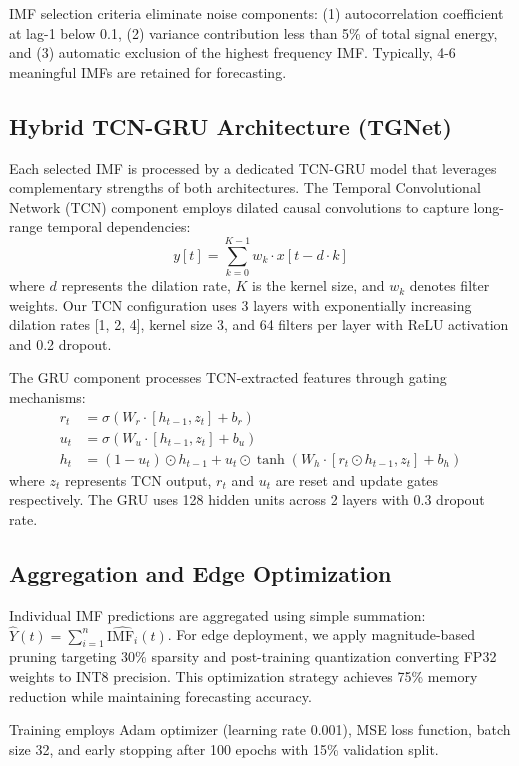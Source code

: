 \documentclass[conference]{IEEEtran}
\begin{document}
IMF selection criteria eliminate noise components: (1) autocorrelation coefficient at lag-1 below 0.1, (2) variance contribution less than 5\% of total signal energy, and (3) automatic exclusion of the highest frequency IMF. Typically, 4-6 meaningful IMFs are retained for forecasting.

\subsection{Hybrid TCN-GRU Architecture (TGNet)}
Each selected IMF is processed by a dedicated TCN-GRU model that leverages complementary strengths of both architectures. The Temporal Convolutional Network (TCN) component employs dilated causal convolutions to capture long-range temporal dependencies:
\begin{equation}
y[t] = \sum_{k=0}^{K-1} w_k \cdot x[t - d \cdot k]
\end{equation}
where $d$ represents the dilation rate, $K$ is the kernel size, and $w_k$ denotes filter weights. Our TCN configuration uses 3 layers with exponentially increasing dilation rates [1, 2, 4], kernel size 3, and 64 filters per layer with ReLU activation and 0.2 dropout.

The GRU component processes TCN-extracted features through gating mechanisms:
\begin{align}
r_t &= \sigma(W_r \cdot [h_{t-1}, z_t] + b_r) \\
u_t &= \sigma(W_u \cdot [h_{t-1}, z_t] + b_u) \\
h_t &= (1 - u_t) \odot h_{t-1} + u_t \odot \tanh(W_h \cdot [r_t \odot h_{t-1}, z_t] + b_h)
\end{align}
where $z_t$ represents TCN output, $r_t$ and $u_t$ are reset and update gates respectively. The GRU uses 128 hidden units across 2 layers with 0.3 dropout rate.

\subsection{Aggregation and Edge Optimization}
Individual IMF predictions are aggregated using simple summation: $\hat{Y}(t) = \sum_{i=1}^{n} \widehat{\text{IMF}_i}(t)$. For edge deployment, we apply magnitude-based pruning targeting 30\% sparsity and post-training quantization converting FP32 weights to INT8 precision. This optimization strategy achieves 75\% memory reduction while maintaining forecasting accuracy.

Training employs Adam optimizer (learning rate 0.001), MSE loss function, batch size 32, and early stopping after 100 epochs with 15\% validation split.
\end{document}
